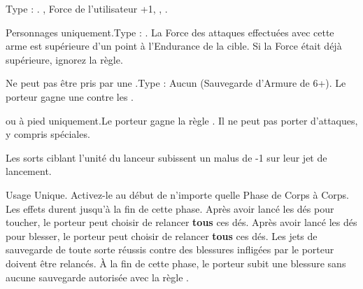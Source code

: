 \closearmynewsection








\startarmymagicalitems

\armymagicalweapons

\startpricelist

Type : \longbow{}. , Force de l'utilisateur +1, , .


Personnages uniquement.\newline Type : \spear{}. La Force des attaques effectuées avec cette arme est supérieure d'un point à l'Endurance de la cible. Si la Force était déjà supérieure, ignorez la règle.

\endpricelist

\armymagicalarmour

\startpricelist

Ne peut pas être pris par une \largetarget{}.\newline Type : Aucun (Sauvegarde d'Armure de 6+). Le porteur gagne une  contre les \magicalattacks{}.

\endpricelist

\armytalismans

\startpricelist

\archmage{} ou \mage{} à pied uniquement.\newline Le porteur gagne la règle \ethereal{}. Il ne peut pas porter d'attaques, y compris spéciales.

\endpricelist

\armyenchanteditems

\startpricelist

Les sorts ciblant l'unité du lanceur subissent un malus de -1 sur leur jet de lancement.

Usage Unique. Activez-le au début de n'importe quelle Phase de Corps à Corps. Les effets durent jusqu'à la fin de cette phase. Après avoir lancé les dés pour toucher, le porteur peut choisir de relancer \textbf{tous} ces dés. Après avoir lancé les dés pour blesser, le porteur peut choisir de relancer \textbf{tous} ces dés. Les jets de sauvegarde de toute sorte réussis contre des blessures infligées par le porteur doivent être relancés. À la fin de cette phase, le porteur subit une blessure sans aucune sauvegarde autorisée avec la règle .

